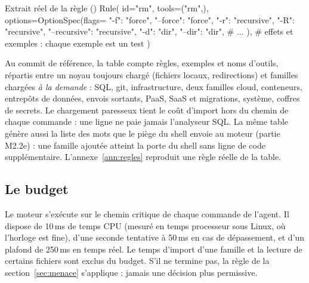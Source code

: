 \begin{code}{Extrait réel de la règle  ()}
Rule(
    id="rm",
    tools=("rm",),
    options=OptionSpec(flags={
        "-f": "force", "--force": "force",
        "-r": "recursive", "-R": "recursive", "--recursive": "recursive",
        "-d": "dir", "--dir": "dir",
        # ...
    }),
    # effets et exemples : chaque exemple est un test
)
\end{code}

Au commit de référence, la table compte \nbregles{} règles, \nbexemples{} exemples et
\nboutils{} noms d'outils, répartis entre un noyau toujours chargé (fichiers locaux,
redirections) et \nbfamilles{} familles chargées \emph{à la demande} : SQL, git,
infrastructure, deux familles cloud, conteneurs, entrepôts de données, envois sortants,
PaaS, SaaS et migrations, système, coffres de secrets. Le chargement paresseux tient le
coût d'import hors du chemin de chaque commande : une ligne  ne paie jamais
l'analyseur SQL. La même table génère aussi la liste des mots que le piège du shell envoie au
moteur (partie M2.2e) : une famille ajoutée atteint la porte du shell sans ligne de code
supplémentaire. L'annexe~\ref{ann:regles} reproduit une règle réelle de la table.

\subsection{Le budget}
Le moteur s'exécute sur le chemin critique de chaque commande de l'agent. Il dispose de
10\,ms de temps CPU (mesuré en temps processeur sous Linux, où l'horloge est fine), d'une
seconde tentative à 50\,ms en cas de dépassement, et d'un plafond de 250\,ms en temps réel.
Le temps d'import d'une famille et la lecture de certains fichiers sont exclus du budget.
S'il ne termine pas, la règle de la section~\ref{sec:menace} s'applique : jamais une
décision plus permissive.
